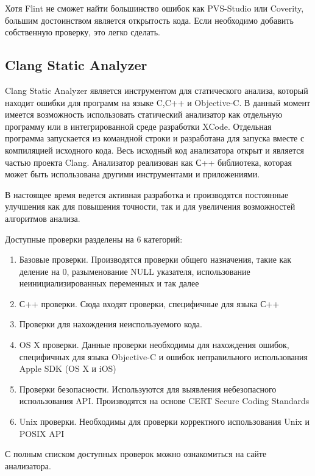 Хотя Flint не сможет найти большинство ошибок как PVS-Studio или Coverity, большим достоинством
является открытость кода. Если необходимо добавить собственную проверку, это легко сделать.
  
\subsection{Clang Static Analyzer}
Clang Static Analyzer является инструментом для статического анализа, который находит ошибки
для программ на языке C,C++ и Objective-C. В данный момент имеется возможность использовать 
статический анализатор как отдельную программу или в интегрированной среде разработки XCode.
Отдельная программа запускается из командной строки и разработана для запуска вместе с компиляцией
исходного кода. Весь исходный код анализатора открыт и является частью проекта Clang. 
Анализатор реализован как С++ библиотека, которая может быть использована другими инструментами и приложениями.
 
В настоящее время ведется активная разработка и производятся постоянные улучшения как для повышения точности, 
так и для увеличения возможностей алгоритмов анализа. 

Доступные проверки разделены на 6 категорий: 
\begin{enumerate}
	\item Базовые проверки. Производятся проверки общего назначения, такие как деление на 0, 
разыменование NULL указателя, использование неинициализированных переменных и так далее
	\item С++ проверки. Сюда входят проверки, специфичные для языка С++
	\item Проверки для нахождения неиспользуемого кода.
	\item OS X проверки. Данные проверки необходимы для нахождения ошибок, специфичных для 
языка Objective-C и ошибок неправильного использования Apple SDK (OS X и iOS)
	\item Проверки безопасности. Используются для выявления небезопасного использования API. 
Производятся на основе CERT Secure Coding Standards 
	\item Unix проверки. Необходимы для проверки корректного использования Unix и POSIX API
\end{enumerate}
С полным списком доступных проверок можно ознакомиться на сайте анализатора.
